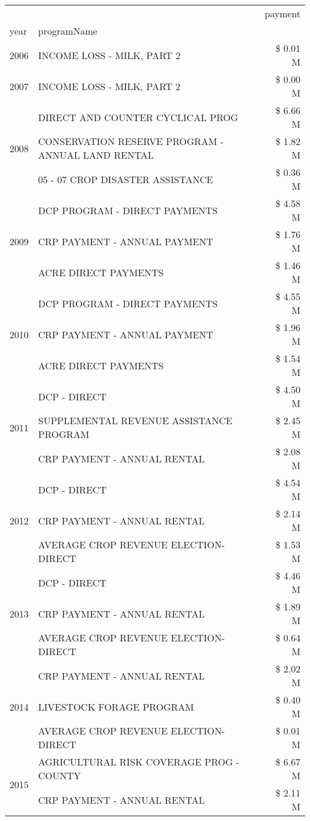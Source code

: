 \begin{tabular}{llr}
\toprule
 &  & payment \\
year & programName &  \\
\midrule
2006 & INCOME LOSS - MILK, PART 2 & \$ 0.01 M \\
\cline{1-3}
2007 & INCOME LOSS - MILK, PART 2 & \$ 0.00 M \\
\cline{1-3}
\multirow[t]{3}{*}{2008} & DIRECT AND COUNTER CYCLICAL PROG & \$ 6.66 M \\
 & CONSERVATION RESERVE PROGRAM - ANNUAL LAND RENTAL & \$ 1.82 M \\
 & 05 - 07 CROP DISASTER ASSISTANCE & \$ 0.36 M \\
\cline{1-3}
\multirow[t]{3}{*}{2009} & DCP PROGRAM - DIRECT PAYMENTS & \$ 4.58 M \\
 & CRP PAYMENT - ANNUAL PAYMENT & \$ 1.76 M \\
 & ACRE DIRECT PAYMENTS & \$ 1.46 M \\
\cline{1-3}
\multirow[t]{3}{*}{2010} & DCP PROGRAM - DIRECT PAYMENTS & \$ 4.55 M \\
 & CRP PAYMENT - ANNUAL PAYMENT & \$ 1.96 M \\
 & ACRE DIRECT PAYMENTS & \$ 1.54 M \\
\cline{1-3}
\multirow[t]{3}{*}{2011} & DCP - DIRECT & \$ 4.50 M \\
 & SUPPLEMENTAL REVENUE ASSISTANCE PROGRAM & \$ 2.45 M \\
 & CRP PAYMENT - ANNUAL RENTAL & \$ 2.08 M \\
\cline{1-3}
\multirow[t]{3}{*}{2012} & DCP - DIRECT & \$ 4.54 M \\
 & CRP PAYMENT - ANNUAL RENTAL & \$ 2.14 M \\
 & AVERAGE CROP REVENUE ELECTION-DIRECT & \$ 1.53 M \\
\cline{1-3}
\multirow[t]{3}{*}{2013} & DCP - DIRECT & \$ 4.46 M \\
 & CRP PAYMENT - ANNUAL RENTAL & \$ 1.89 M \\
 & AVERAGE CROP REVENUE ELECTION-DIRECT & \$ 0.64 M \\
\cline{1-3}
\multirow[t]{3}{*}{2014} & CRP PAYMENT - ANNUAL RENTAL & \$ 2.02 M \\
 & LIVESTOCK FORAGE PROGRAM & \$ 0.40 M \\
 & AVERAGE CROP REVENUE ELECTION-DIRECT & \$ 0.01 M \\
\cline{1-3}
\multirow[t]{3}{*}{2015} & AGRICULTURAL RISK COVERAGE PROG - COUNTY & \$ 6.67 M \\
 & CRP PAYMENT - ANNUAL RENTAL & \$ 2.11 M \\

\end{tabular}
